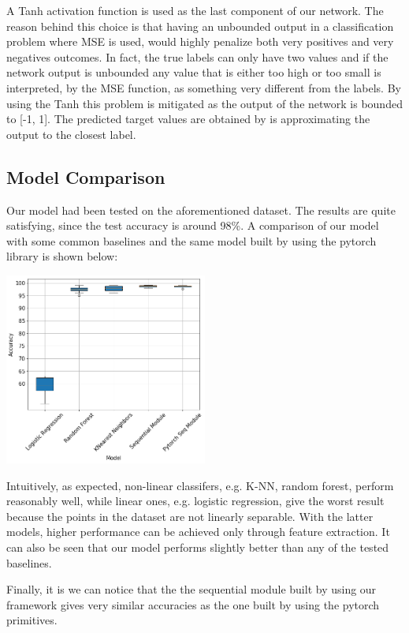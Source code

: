 \documentclass[10pt,conference,compsocconf]{IEEEtran}
\begin{document}
A Tanh activation function is used as the last component of our network. The reason behind this choice is that having an unbounded output in a classification problem where MSE is used, would highly penalize both very positives and very negatives outcomes. In fact, the true labels can only have two values and if the network output is unbounded any value that is either too high or too small is interpreted, by the MSE function, as something very different from the labels. By using the Tanh this problem is mitigated as the output of the network is bounded to [-1, 1]. The predicted target values are obtained by is approximating the output to the closest label.

\subsection{Model Comparison}
Our model had been tested on the aforementioned dataset. The results are quite satisfying, since the test accuracy is around 98\%.
A comparison of our model with some common baselines and the same model built by using the pytorch library is shown below:
\begin{center}
	\captionsetup{type=figure}
	\includegraphics[width=0.5\textwidth]{img/boxplots_final.png}
	\label{fig:boxplot}
\end{center} 
Intuitively, as expected, non-linear classifers, e.g. K-NN, random forest, perform reasonably well, while linear ones, e.g. logistic regression, give the worst result because the points in the dataset are not linearly separable. With the latter models, higher performance can be achieved only through feature extraction. It can also be seen that our model performs slightly better than any of the tested baselines.

Finally, it is we can notice that the the sequential module built by using our framework gives very similar accuracies as the one built by using the pytorch primitives.
\end{document}
